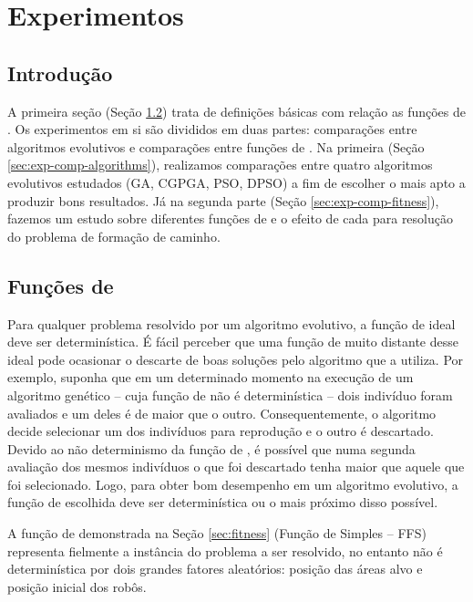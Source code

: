 \chapter{Experimentos}
\label{cha:experiments}

\section{Introdução}


A primeira seção (Seção \ref{sec:exp-fitness}) trata de definições básicas com relação as funções de \fitness. Os experimentos em si são divididos em duas partes: comparações entre algoritmos evolutivos e comparações entre funções de \fitness. Na primeira (Seção \ref{sec:exp-comp-algorithms}), realizamos comparações entre quatro algoritmos evolutivos estudados (GA, CGPGA, PSO, DPSO) a fim de escolher o mais apto a produzir bons resultados. Já na segunda parte (Seção \ref{sec:exp-comp-fitness}), fazemos um estudo sobre diferentes funções de \fitness e o efeito de cada para resolução do problema de formação de caminho.


\section{Funções de \fitness}
\label{sec:exp-fitness}

Para qualquer problema resolvido por um algoritmo evolutivo, a função de \fitness ideal deve ser determinística. É fácil perceber que uma função de \fitness muito distante desse ideal pode ocasionar o descarte de boas soluções pelo algoritmo que a utiliza. Por exemplo, suponha que em um determinado momento na execução de um algoritmo genético -- cuja função de \fitness não é determinística -- dois indivíduo foram avaliados e um deles é de maior \fitness que o outro. Consequentemente, o algoritmo decide selecionar um dos indivíduos para reprodução e o outro é descartado. Devido ao não determinismo da função de \fitness, é possível que numa segunda avaliação dos mesmos indivíduos o que foi descartado tenha maior \fitness que aquele que foi selecionado. Logo, para obter bom desempenho em um algoritmo evolutivo, a função de \fitness escolhida deve ser determinística ou o mais próximo disso possível.

A função de \fitness demonstrada na Seção \ref{sec:fitness} (Função de \fitness Simples -- FFS) representa fielmente a instância do problema a ser resolvido, no entanto não é determinística por dois grandes fatores aleatórios: posição das áreas alvo e posição inicial dos robôs.

